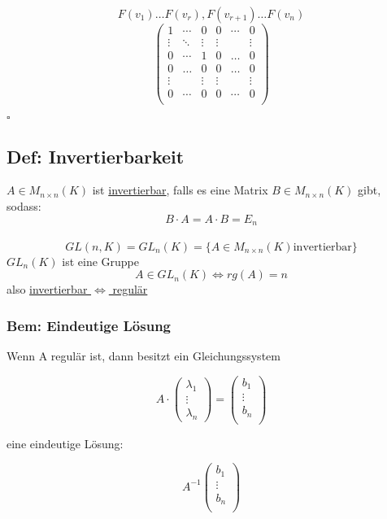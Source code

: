 \documentclass[titlepage,12pt,a4paper,ngerman]{report}
\begin{document}
$$F(v_1) \dots F(v_r), F(v_{r+1}) \dots F(v_n)$$ 
\nopagebreak
$$\begin{pmatrix}
1   &\cdots  & 0  &   0 & \cdots & 0 \\
\vdots   &\ddots & \vdots  & \vdots && \vdots\\
0 & \cdots  &1 &  0 & \dots & 0 \\
0 & \dots & 0 & 0 & \dots & 0 \\
\vdots  & & \vdots & \vdots & & \vdots\\
0&\cdots &0 & 0&\cdots & 0\\
\end{pmatrix} $$

\begin{flushright}
	$\square$
\end{flushright}

\subsection{Def: Invertierbarkeit}
$A \in M_{n\times n} (K) $ ist \underline{invertierbar}, falls es eine Matrix $B\in M_{n\times n} (K)$ gibt, sodass: $$B\cdot A = A\cdot B = E_n$$\\
$$GL(n,K)= GL_n(K) = \{A\in M_{n\times n} (K) \textrm{invertierbar}\}$$
$GL_n(K)$ ist eine Gruppe\\
$$A\in GL_n(K) \Leftrightarrow rg(A) = n$$
also \underline{invertierbar $\Leftrightarrow$ regulär}\\

\subsubsection{Bem: Eindeutige Lösung}
Wenn A regulär ist, dann besitzt ein Gleichungssystem

$$A \cdot \begin{pmatrix}
\lambda_1\\
\vdots\\
\lambda_n
\end{pmatrix} 
= \begin{pmatrix}
b_1\\
\vdots\\
b_n\\
\end{pmatrix}$$

eine eindeutige Lösung:

$$A^{-1} \begin{pmatrix}
b_1\\
\vdots\\
b_n\\
\end{pmatrix}$$
\end{document}
